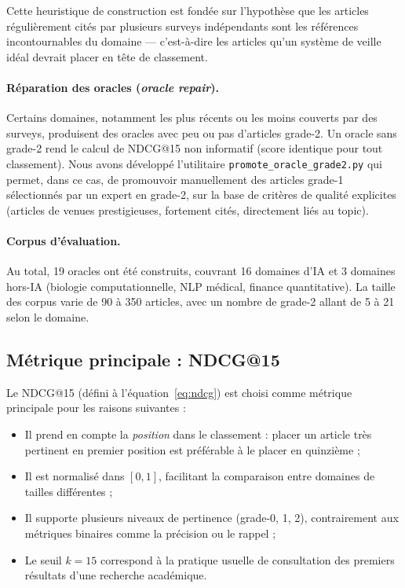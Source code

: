 Cette heuristique de construction est fondée sur l'hypothèse que les
articles régulièrement cités par plusieurs surveys indépendants sont
les références incontournables du domaine — c'est-à-dire les articles
qu'un système de veille idéal devrait placer en tête de classement.

\paragraph{Réparation des oracles (\textit{oracle repair}).}
Certains domaines, notamment les plus récents ou les moins couverts par
des surveys, produisent des oracles avec peu ou pas d'articles grade-2.
Un oracle sans grade-2 rend le calcul de NDCG@15 non informatif (score
identique pour tout classement). Nous avons développé l'utilitaire
\texttt{promote\_oracle\_grade2.py} qui permet, dans ce cas, de promouvoir
manuellement des articles grade-1 sélectionnés par un expert en grade-2,
sur la base de critères de qualité explicites (articles de venues
prestigieuses, fortement cités, directement liés au topic).

\paragraph{Corpus d'évaluation.}
Au total, 19 oracles ont été construits, couvrant 16 domaines d'IA et
3 domaines hors-IA (biologie computationnelle, NLP médical, finance
quantitative). La taille des corpus varie de 90 à 350 articles, avec
un nombre de grade-2 allant de 5 à 21 selon le domaine.

\subsection{Métrique principale : NDCG@15}

Le NDCG@15 (défini à l'équation~\ref{eq:ndcg}) est choisi comme
métrique principale pour les raisons suivantes :

\begin{itemize}
  \item Il prend en compte la \textit{position} dans le classement : placer
    un article très pertinent en premier position est préférable à le
    placer en quinzième ;
  \item Il est normalisé dans $[0, 1]$, facilitant la comparaison entre
    domaines de tailles différentes ;
  \item Il supporte plusieurs niveaux de pertinence (grade-0, 1, 2),
    contrairement aux métriques binaires comme la précision ou le rappel ;
  \item Le seuil $k=15$ correspond à la pratique usuelle de consultation
    des premiers résultats d'une recherche académique.
\end{itemize}

